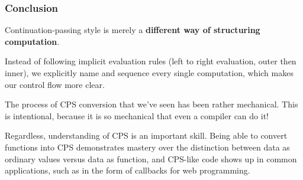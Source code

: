 \documentclass[aspectratio=169, handout]{beamer}
\begin{document}
\begin{frame}[fragile]
  \frametitle{Conclusion}

  Continuation-passing style is merely a \textbf{different way of structuring
  computation}.

  \pause
  \vspace{\fill}

  Instead of following implicit evaluation rules (left to right evaluation,
  outer then inner), we explicitly name and sequence every single computation,
  which makes our control flow more clear.

  \pause
  \vspace{\fill}

  The process of CPS conversion that we've seen has been rather mechanical. This
  is intentional, because it is so mechanical that even a compiler can do it!

  \pause
  \vspace{\fill}

  Regardless, understanding of CPS is an important skill. Being able to convert functions
  into CPS demonstrates mastery over the distinction between data as
  ordinary values versus data as function, and CPS-like code shows up in common
  applications, such as in the form of callbacks for web programming.
\end{frame}



\thankyou
\end{document}
